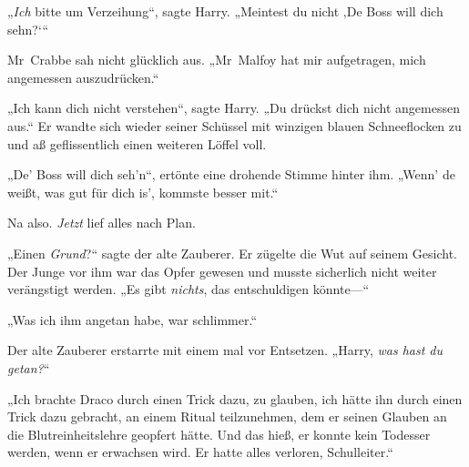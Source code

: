 „\emph{Ich} bitte um Verzeihung“, sagte Harry. „Meintest du nicht ‚De Boss will dich sehn?‘“

Mr~Crabbe sah nicht glücklich aus. „Mr~Malfoy hat mir aufgetragen, mich angemessen auszudrücken.“

„Ich kann dich nicht verstehen“, sagte Harry. „Du drückst dich nicht angemessen aus.“ Er wandte sich wieder seiner Schüssel mit winzigen blauen Schneeflocken zu und aß geflissentlich einen weiteren Löffel voll.

„De’ Boss will dich seh’n“, ertönte eine drohende Stimme hinter ihm. „Wenn’ de weißt, was gut für dich is’, kommste besser mit.“

Na also. \emph{Jetzt} lief alles nach Plan.


„Einen \emph{Grund}?“ sagte der alte Zauberer. Er zügelte die Wut auf seinem Gesicht. Der Junge vor ihm war das Opfer gewesen und musste sicherlich nicht weiter verängstigt werden. „Es gibt \emph{nichts}, das entschuldigen könnte—“

„Was ich ihm angetan habe, war schlimmer.“

Der alte Zauberer erstarrte mit einem mal vor Entsetzen. „Harry, \emph{was hast du getan?}“

„Ich brachte Draco durch einen Trick dazu, zu glauben, ich hätte ihn durch einen Trick dazu gebracht, an einem Ritual teilzunehmen, dem er seinen Glauben an die Blutreinheitslehre geopfert hätte. Und das hieß, er konnte kein Todesser werden, wenn er erwachsen wird. Er hatte alles verloren, Schulleiter.“

